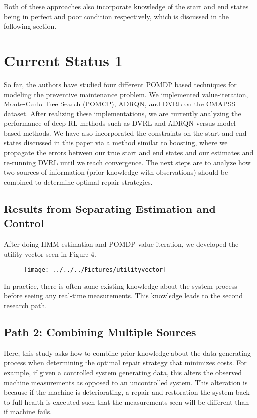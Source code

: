 \documentclass[english]{article}
\numberwithin{equation}{section}
\begin{document}
	Both of these approaches also incorporate knowledge of the start and end states being in perfect and poor condition respectively, which is discussed in the following section.
	
	\section*{Current Status 1}
	
	So far, the authors have studied four different POMDP based techniques for modeling the preventive maintenance problem. We implemented value-iteration, Monte-Carlo Tree Search (POMCP), ADRQN, and DVRL on the CMAPSS dataset. After realizing these implementations, we are currently analyzing the performance of deep-RL methods such as DVRL and ADRQN versus model-based methods. We have also incorporated the constraints on the start and end states discussed in this paper via a method similar to boosting, where we propagate the errors between our true start and end states and our estimates and re-running DVRL until we reach convergence. The next steps are to analyze how two sources of information (prior knowledge with observations) should be combined to determine optimal repair strategies.
	
	\subsection*{Results from Separating Estimation and Control}
	After doing HMM estimation and POMDP value iteration, we developed the utility vector seen in Figure 4.
	
		\begin{figure}
		\centering
		\texttt{[image: ../../../Pictures/utilityvector]}
		\caption[Utility vector]{}
		\label{fig:utilityvec}
	\end{figure}
	
	In practice, there is often some existing knowledge about the system process before seeing any real-time measurements. This knowledge leads to the second research path.
	
	\subsection*{Path 2: Combining Multiple Sources}
	
	Here, this study asks how to combine prior knowledge about the data generating process when determining the optimal repair strategy that minimizes costs. For example, if given a controlled system generating data, this alters the observed machine measurements as opposed to an uncontrolled system. This alteration is because if the machine is deteriorating, a repair and restoration the system back to full health is executed such that the measurements seen will be different than if machine fails.
	
\end{document}
